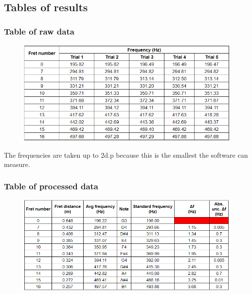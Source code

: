 \documentclass[11pt]{article}
\begin{document}
\begin{flushleft}
        \subsection{Tables of results}
            \FloatBarrier  
            \subsubsection*{Table of raw data}
                \begin{figure}[!htb]
                    \includegraphics[width = \textwidth]{raw_table.png}
                \end{figure}
            \FloatBarrier
            The frequencies are taken up to 2d.p because this is the smallest the software can measure.
            \FloatBarrier
            \subsubsection*{Table of processed data}
                \begin{figure}[!htb]
                    \includegraphics[width = \textwidth]{processed_table.png}
                \end{figure}
            \FloatBarrier

\end{flushleft}
\end{document}
